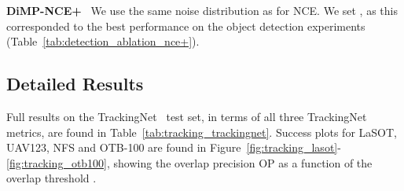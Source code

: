 \documentclass{bmvc2k}
\newcommand{\parsection}[1]{\vspace{2mm}\noindent\textbf{#1}~ }
\begin{document}
\begin{appendices}
\parsection{DiMP-NCE+}
We use the same noise distribution  as for NCE. We set , as this corresponded to the best performance on the object detection experiments (Table~\ref{tab:detection_ablation_nce+}).










\subsection{Detailed Results}
Full results on the TrackingNet~\cite{muller2018trackingnet} test set, in terms of all three TrackingNet metrics, are found in Table~\ref{tab:tracking_trackingnet}. Success plots for LaSOT, UAV123, NFS and OTB-100 are found in Figure~\ref{fig:tracking_lasot}-\ref{fig:tracking_otb100}, showing the overlap precision OP as a function of the overlap threshold .


 \end{appendices}
\end{document}
